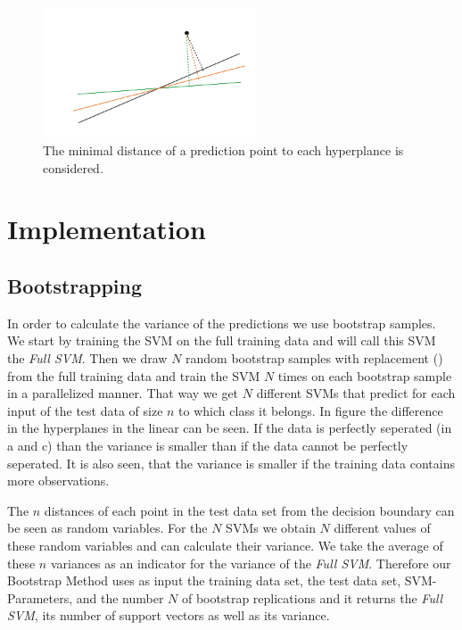 \documentclass[a4paper]{article}
\begin{document}
\begin{figure}[!htb]
\begin{center}
\includegraphics[width=2.5in]{abb/distances.jpg}
\caption{The minimal distance of a prediction point to each hyperplance is considered.}
\label{fig1}
\end{center}
\end{figure}




\section{Implementation}

\subsection{Bootstrapping}
In order to calculate the variance of the predictions we use bootstrap samples. We start by training the SVM on the full training data and will call this SVM the \textit{Full SVM}. Then we draw $N$ random bootstrap samples with replacement (\cite{christmann_bootstrap_2013}) from the full training data and train the SVM $N$ times on each bootstrap sample in a parallelized manner. That way we get $N$ different SVMs that predict for each input of the test data of size $n$ to which class it belongs. In figure \label{fig2} the difference in the hyperplanes in the linear can be seen. If the data is perfectly seperated (in a and c) than the variance is smaller than if the data cannot be perfectly seperated. It is also seen, that the variance is smaller if the training data contains more observations.

The $n$ distances of each point in the test data set from the decision boundary can be seen as random variables. For the $N$ SVMs we obtain $N$ different values of these random variables and can calculate their variance. We take the average of these $n$ variances as an indicator for the variance of the \textit{Full SVM}. Therefore our Bootstrap Method uses as input the training data set, the test data set, SVM-Parameters, and the number $N$ of bootstrap replications and it returns the \textit{Full SVM}, its number of support vectors as well as its variance.
\end{document}
